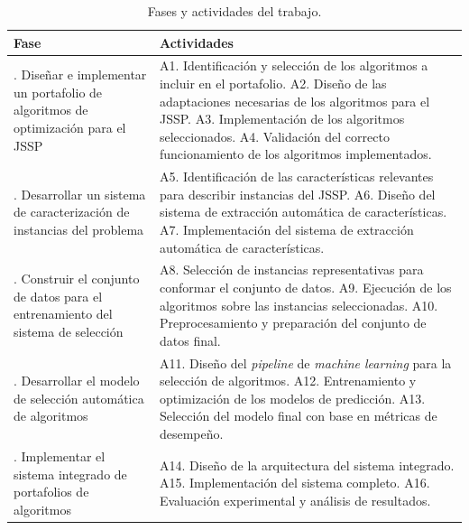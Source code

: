 \begin{table}[H]
  \centering
  \small
  \singlespacing
  \caption{Fases y actividades del trabajo.}
  \label{tab:fases}
  \begin{tabularx}{\textwidth}{>{\raggedright\arraybackslash}p{}
                               >{\raggedright\arraybackslash}X}
    \toprule
    \textbf{Fase} & \textbf{Actividades} \\
    \midrule
    1. Diseñar e implementar un portafolio de algoritmos de optimización para
    el JSSP
      & A1. Identificación y selección de los algoritmos a incluir en el
          portafolio.\newline
        A2. Diseño de las adaptaciones necesarias de los algoritmos para el
          JSSP.\newline
        A3. Implementación de los algoritmos seleccionados.\newline
        A4. Validación del correcto funcionamiento de los algoritmos
          implementados. \\
    \addlinespace
    2. Desarrollar un sistema de caracterización de instancias del problema
      & A5. Identificación de las características relevantes para describir
          instancias del JSSP.\newline
        A6. Diseño del sistema de extracción automática de
          características.\newline
        A7. Implementación del sistema de extracción automática de
          características. \\
    \addlinespace
    3. Construir el conjunto de datos para el entrenamiento del sistema de
    selección
      & A8. Selección de instancias representativas para conformar el conjunto
          de datos.\newline
        A9. Ejecución de los algoritmos sobre las instancias
          seleccionadas.\newline
        A10. Preprocesamiento y preparación del conjunto de datos final. \\
    \addlinespace
    4. Desarrollar el modelo de selección automática de algoritmos
      & A11. Diseño del \textit{pipeline} de \textit{machine learning} para la
          selección de algoritmos.\newline
        A12. Entrenamiento y optimización de los modelos de
          predicción.\newline
        A13. Selección del modelo final con base en métricas de desempeño. \\
    \addlinespace
    5. Implementar el sistema integrado de portafolios de algoritmos
      & A14. Diseño de la arquitectura del sistema integrado.\newline
        A15. Implementación del sistema completo.\newline
        A16. Evaluación experimental y análisis de resultados. \\
    \bottomrule
  \end{tabularx}
\end{table}

